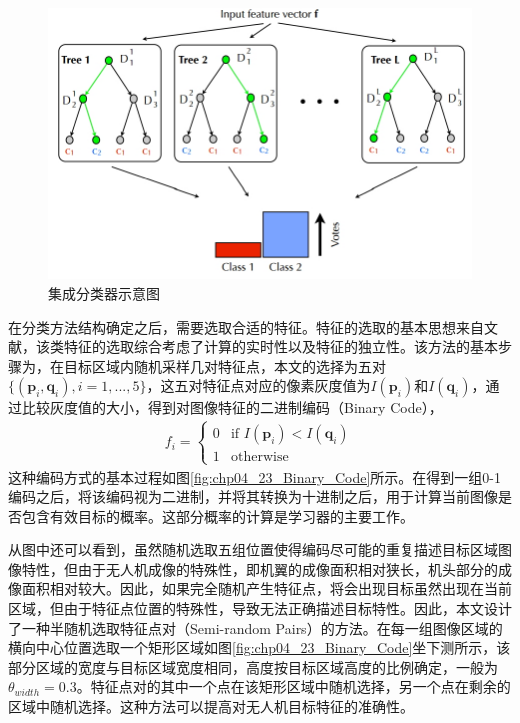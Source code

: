 \begin{figure}[ht]   
	\centering
	\includegraphics[width=\textwidth]{figs/161002_Thesis_Tracking_Section_05.pdf}
	\caption{集成分类器示意图}
	\label{fig:161002_Thesis_Tracking_Section_05}
\end{figure}

在分类方法结构确定之后，需要选取合适的特征。特征的选取的基本思想来自文献\cite{lepetit2005randomized}，该类特征的选取综合考虑了计算的实时性以及特征的独立性。该方法的基本步骤为，在目标区域内随机采样几对特征点，本文的选择为五对$\{(\mathbf{p}_i,\mathbf{q}_i),i=1,...,5\}$，这五对特征点对应的像素灰度值为$I(\mathbf{p}_i)$和$I(\mathbf{q}_i)$，通过比较灰度值的大小，得到对图像特征的二进制编码（Binary Code），
\begin{align}
f_i=\left\{ \begin{array}{ll}
0 &\mbox{if $I(\mathbf{p}_i) < I(\mathbf{q}_i)$} \\
1 &\mbox{otherwise} \end{array} \right.
\end{align}
这种编码方式的基本过程如图\ref{fig:chp04_23_Binary_Code}所示。在得到一组0-1编码之后，将该编码视为二进制，并将其转换为十进制之后，用于计算当前图像是否包含有效目标的概率。这部分概率的计算是学习器的主要工作。

从图中还可以看到，虽然随机选取五组位置使得编码尽可能的重复描述目标区域图像特性，但由于无人机成像的特殊性，即机翼的成像面积相对狭长，机头部分的成像面积相对较大。因此，如果完全随机产生特征点，将会出现目标虽然出现在当前区域，但由于特征点位置的特殊性，导致无法正确描述目标特性。因此，本文设计了一种半随机选取特征点对（Semi-random Pairs）的方法。在每一组图像区域的横向中心位置选取一个矩形区域如图\ref{fig:chp04_23_Binary_Code}坐下测所示，该部分区域的宽度与目标区域宽度相同，高度按目标区域高度的比例确定，一般为$\theta_{width}=0.3$。特征点对的其中一个点在该矩形区域中随机选择，另一个点在剩余的区域中随机选择。这种方法可以提高对无人机目标特征的准确性。

